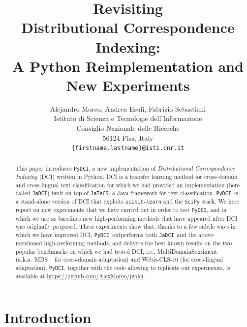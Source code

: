 \documentclass{article}
\title{Revisiting \\ Distributional Correspondence Indexing: \\ A Python Reimplementation and New Experiments}
\author{
  Alejandro Moreo, Andrea Esuli, Fabrizio Sebastiani \\
  Istituto di Scienza e Tecnologie dell'Informazione \\
  Consiglio Nazionale delle Ricerche \\
  56124 Pisa, Italy\\
  \texttt{\{firstname.lastname\}@isti.cnr.it} \\
}
\newcommand{\jadci}{\texttt{JaDCI}}
\newcommand{\pydci}{\texttt{PyDCI}}
\begin{document}
\maketitle

\begin{abstract}
  This paper introduces \pydci, a new implementation of
  \emph{Distributional Correspondence Indexing} (DCI) written in
  Python. DCI is a transfer learning method for cross-domain and
  cross-lingual text classification for which we had provided an
  implementation (here called \jadci) built on top of \texttt{JaTeCS},
  a Java framework for text classification. \pydci\ is a stand-alone
  version of DCI that exploits \texttt{scikit-learn} and the
  \texttt{SciPy} stack.
  We here report on new experiments that we have carried out in order
  to test \pydci, and in which we use as baselines new high-performing
  methods that have appeared after DCI was originally proposed.  These
  experiments show that, thanks to a few subtle ways in which we have
  improved DCI, \pydci\ outperforms both \jadci\ and the
  above-mentioned high-performing methods, and delivers the best known
  results on the two popular benchmarks on which we had tested DCI,
  i.e., MultiDomainSentiment (a.k.a.\ MDS -- for cross-domain
  adaptation) and Webis-CLS-10 (for cross-lingual adaptation). \pydci,
  together with the code allowing to replicate our experiments, is
  available at \url{https://github.com/AlexMoreo/pydci} .
\end{abstract}




\section{Introduction}
\end{document}
